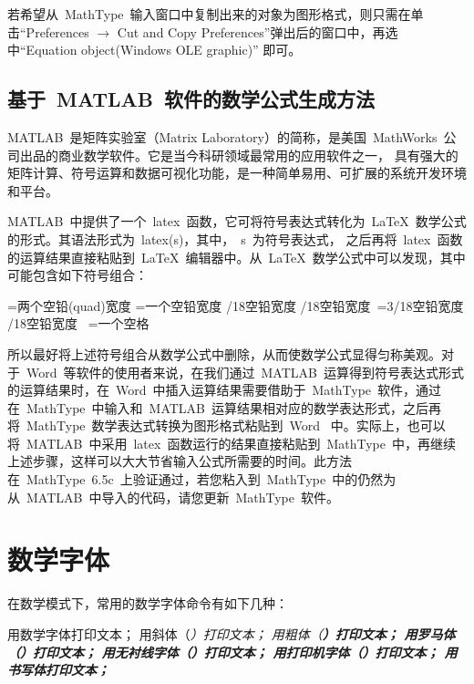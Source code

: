 若希望从~MathType~输入窗口中复制出来的对象为图形格式，则只需在单击“Preferences
$\rightarrow$ Cut and Copy Preferences”弹出后的窗口中，再选中“Equation object(Windows OLE graphic)” 即可。

\subsection{基于~MATLAB~软件的数学公式生成方法}


MATLAB~是矩阵实验室（Matrix Laboratory）的简称，是美国~MathWorks~公司出品的商业数学软件。它是当今科研领域最常用的应用软件之一，
具有强大的矩阵计算、符号运算和数据可视化功能，是一种简单易用、可扩展的系统开发环境和平台。


MATLAB~中提供了一个~latex~函数，它可将符号表达式转化为~\LaTeX~数学公式的形式。其语法形式为~latex(s)，其中，~s~为符号表达式，
之后再将~latex~函数的运算结果直接粘贴到~\LaTeX~编辑器中。从~\LaTeX~数学公式中可以发现，其中可能包含如下符号组合：

\begin{verbatim*}
\qquad=两个空铅(quad)宽度
\quad=一个空铅宽度
/18空铅宽度
/18空铅宽度
\,=3/18空铅宽度
/18空铅宽度
\ =一个空格
\end{verbatim*}

所以最好将上述符号组合从数学公式中删除，从而使数学公式显得匀称美观。对于~Word~等软件的使用者来说，在我们通过~MATLAB~运算得到符号表达式形式的运算结果时，在~Word~中插入运算结果需要借助于~MathType~软件，通过在~MathType~中输入和~MATLAB~运算结果相对应的数学表达形式，之后再将~MathType~数学表达式转换为图形格式粘贴到~Word~ 中。实际上，也可以将~MATLAB~中采用~latex~函数运行的结果直接粘贴到~MathType~中，再继续上述步骤，这样可以大大节省输入公式所需要的时间。此方法在~MathType~6.5c~上验证通过，若您粘入到~MathType~中的仍然为从~MATLAB~中导入的代码，请您更新~MathType~软件。

\section{数学字体}
在数学模式下，常用的数学字体命令有如下几种：

\begin{VerbWithBreak}
 用数学字体打印文本；
\mathit             用斜体（\itshape）打印文本；
\mathbf             用粗体（\bfseries）打印文本；
\mathrm             用罗马体（\rmfamily）打印文本；
\mathsf             用无衬线字体（\sffamily）打印文本；
\mathtt             用打印机字体（\ttfamily）打印文本；
\mathcal            用书写体打印文本；
\end{VerbWithBreak}

